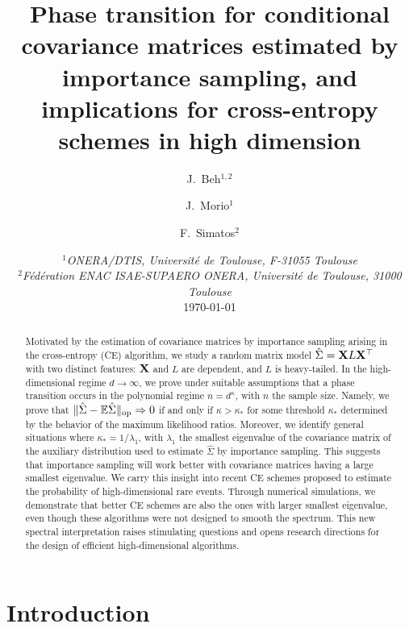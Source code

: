 \documentclass[]{article}
\newcommand{\E}{\mathbb{E}}
\newcommand{\op}{{\rm op}}
\theoremstyle{plain}
\theoremstyle{definition}
\begin{document}
\title{Phase transition for conditional covariance matrices estimated by importance sampling, and implications for cross-entropy schemes in high dimension}

\author{J.\ Beh$^{1,2}$ \and J.\ Morio$^{1}$ \and F.\ Simatos$^{2}$}
\date{%
    $^1${\small \it ONERA/DTIS, Université de Toulouse, F-31055 Toulouse}\\%
    $^2${\small \it Fédération ENAC ISAE-SUPAERO ONERA, Université de Toulouse, 31000 Toulouse}\\[2ex]%
    \today
}


\maketitle

\begin{abstract}
Motivated by the estimation of covariance matrices by importance sampling arising in the cross-entropy (CE) algorithm, we study a random matrix model $\hat \Sigma = {\bf X} L {\bf X}^\top$ with two distinct features: $\bf X$ and $L$ are dependent, and $L$ is heavy-tailed. In the high-dimensional regime $d \to \infty$, we prove under suitable assumptions that a phase transition occurs in the polynomial regime $n = d^\kappa$, with $n$ the sample size. Namely, we prove that $\lVert \hat \Sigma - \E \hat \Sigma \rVert_\op \Rightarrow 0$ if and only if $\kappa > \kappa_*$ for some threshold $\kappa_*$ determined by the behavior of the maximum likelihood ratios. Moreover, we identify general situations where $\kappa_* = 1/\lambda_1$, with $\lambda_1$ the smallest eigenvalue of the covariance matrix of the auxiliary distribution used to estimate $\hat \Sigma$ by importance sampling. This suggests that importance sampling will work better with covariance matrices having a large smallest eigenvalue. We carry this insight into recent CE schemes proposed to estimate the probability of high-dimensional rare events. Through numerical simulations, we demonstrate that better CE schemes are also the ones with larger smallest eigenvalue, even though these algorithms were not designed to smooth the spectrum. This new spectral interpretation raises stimulating questions and opens research directions for the design of efficient high-dimensional algorithms.
\end{abstract}


\section{Introduction}
\end{document}
